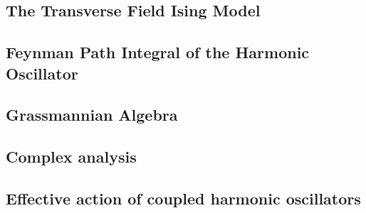 




% 

% 
% 
% 


\setcounter{section}{2}
\subsection{The Transverse Field Ising Model}

% 

\newpage
\setcounter{section}{3}
\subsection{Feynman Path Integral of the Harmonic Oscillator}

\subsection{Grassmannian Algebra}



\newpage
\setcounter{section}{4}
\subsection{Complex analysis}

\subsection{Effective action of coupled harmonic oscillators}


% 
% 
% 


